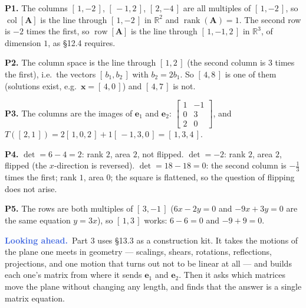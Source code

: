 \documentclass[11pt]{article}
\theoremstyle{plain}
\theoremstyle{definition}
\theoremstyle{remark}
\newcommand{\lookahead}{\par\smallskip\noindent
  \textbf{\sffamily\textcolor{RoyalBlue}{Looking ahead.}}\ \ignorespaces}
\newcommand{\R}{\mathbb{R}}
\newcommand{\vc}[1]{\mathbf{#1}}        %
\newcommand{\mt}[1]{\mathbf{#1}}        %
\newcommand{\colsp}[1]{\operatorname{col}[#1]}
\newcommand{\rowsp}[1]{\operatorname{row}[#1]}
\DeclareMathOperator{\rank}{rank}
\begin{document}
\noindent\textbf{P1.} The columns $[\,1,-2\,]$, $[\,-1,2\,]$, $[\,2,-4\,]$
are all multiples of $[\,1,-2\,]$, so $\colsp{\mt{A}}$ is the line through
$[\,1,-2\,]$ in $\R^{2}$ and $\rank(\mt{A})=1$. The second row is $-2$ times
the first, so $\rowsp{\mt{A}}$ is the line through $[\,1,-1,2\,]$ in $\R^{3}$,
of dimension $1$, as \S12.4 requires.

\smallskip
\noindent\textbf{P2.} The column space is the line through $[\,1,2\,]$ (the
second column is $3$ times the first), i.e.\ the vectors $[\,b_1,b_2\,]$ with
$b_2=2b_1$. So $[\,4,8\,]$ is one of them (solutions exist, e.g.\
$\vc{x}=[\,4,0\,]$) and $[\,4,7\,]$ is not.

\smallskip
\noindent\textbf{P3.} The columns are the images of $\vc{e}_1$ and $\vc{e}_2$:
$\begin{bmatrix}1&-1\\0&3\\2&0\end{bmatrix}$, and
$T([\,2,1\,])=2[\,1,0,2\,]+1[\,-1,3,0\,]=[\,1,3,4\,]$.

\smallskip
\noindent\textbf{P4.} $\det=6-4=2$: rank $2$, area $2$, not flipped.
$\det=-2$: rank $2$, area $2$, flipped (the $x$-direction is reversed).
$\det=18-18=0$: the second column is $-\tfrac13$ times the first; rank $1$,
area $0$; the square is flattened, so the question of flipping does not arise.

\smallskip
\noindent\textbf{P5.} The rows are both multiples of $[\,3,-1\,]$
($6x-2y=0$ and $-9x+3y=0$ are the same equation $y=3x$), so $[\,1,3\,]$ works:
$6-6=0$ and $-9+9=0$.

\lookahead Part 3 uses \S13.3 as a construction kit. It takes the motions of
the plane one meets in geometry --- scalings, shears, rotations, reflections,
projections, and one motion that turns out not to be linear at all --- and
builds each one's matrix from where it sends $\vc{e}_1$ and $\vc{e}_2$. Then it
asks which matrices move the plane without changing any length, and finds that
the answer is a single matrix equation.
\end{document}
